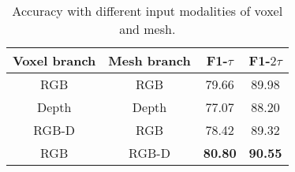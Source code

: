 \begin{table}[ht]
\begin{center}
\footnotesize
\begin{tabular}{c c | c c}
\toprule[1pt]
    Voxel branch    & Mesh branch   & F1-$\tau$         & F1-$2\tau$ \\ \hline
    RGB             & RGB           & 79.66             & 89.98 \\
    Depth           & Depth         & 77.07             & 88.20 \\
    RGB-D           & RGB           & 78.42             & 89.32 \\
    RGB             & RGB-D         & \textbf{80.80}    & \textbf{90.55} \\
\bottomrule[1pt]
\end{tabular}
\end{center}
\caption{
    Accuracy with different input modalities of voxel and mesh.
}
\label{table:input_modality_accuracy}
\end{table}

